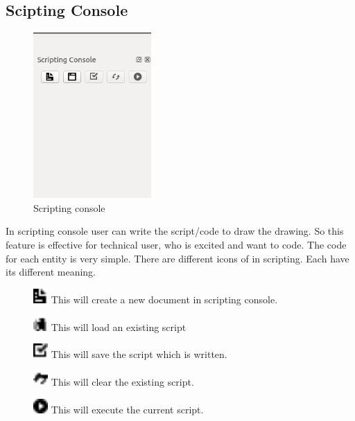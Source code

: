 \subsection{Scipting Console}
\begin{figure}[h!]
\centering
\includegraphics[width=0.4\textwidth]{images/scriptingconsole.png} 
\caption{Scripting console}
\end{figure}
In scripting console user can write the script/code to draw the drawing. So this feature is effective for technical user, who is excited and want to code. The code for each entity is very simple. There are different icons of in scripting. Each have its different meaning.
\begin{figure}[h!]
\includegraphics[width=0.05\textwidth]{images/document.jpg} 
This will create a new document in scripting console.
\end{figure}
\begin{figure}[h!]
\includegraphics[width=0.05\textwidth]{images/browser.jpg} 
This will load an existing script
\end{figure}
\begin{figure}[h!]
\includegraphics[width=0.05\textwidth]{images/task.jpg} 
This will save the script which is written.
\end{figure}
\begin{figure}[h!]
\includegraphics[width=0.05\textwidth]{images/loop-circular.jpg} 
This will clear the existing script.
\end{figure}
\begin{figure}[h!]
\includegraphics[width=0.05\textwidth]{images/play-circle.jpg} 
This will execute the current script.
\end{figure}
\newpage
